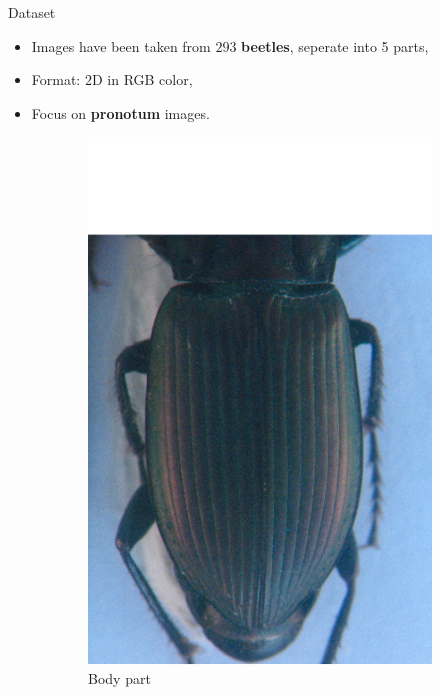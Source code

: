 \documentclass[10pt,svgnames]{beamer}
\begin{document}


\begin{frame}[c]{Dataset}
	\begin{itemize}
    	\item Images have been taken from $293$ \textbf{beetles}, seperate into 5 parts,
    	\item Format: $2$D in RGB color,
    	\item Focus on \textbf{\color{red}pronotum} images.
  	\end{itemize}
	
	\begin{figure}[htbp]
    			\begin{subfigure}[t]{0.3\textwidth}
        			\centering
        			\includegraphics[scale=.2]{images/elytre2}
        			\caption*{\footnotesize{Body part}}
        			\label{figsub22}
    			\end{subfigure}
    			~ 
    			\begin{subfigure}[t]{0.3\textwidth}

\end{subfigure}
\end{figure}
\end{frame}
\end{document}
